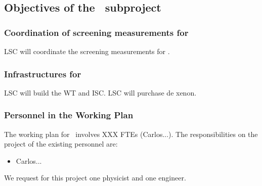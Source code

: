 \subsection{Objectives of the \sUPV\ subproject}
\label{sec.obj.dipc}

\subsubsection*{Coordination of screening measurements for \NHD}

\indent

LSC will coordinate the screening measurements for \NHD. 
 
\subsubsection*{Infrastructures for \NHD}

\indent

LSC will build the WT and ISC. LSC will purchase de xenon.   
 

\subsubsection*{Personnel in the Working Plan}
The working plan for \sLSC\ involves XXX FTEs (Carlos...). The responsibilities on the project of the existing personnel are:


\begin{itemize}[noitemsep,topsep=0pt,parsep=0pt,partopsep=0pt]
\item Carlos... 
\end{itemize}

We request for this project one physicist and one engineer. 
